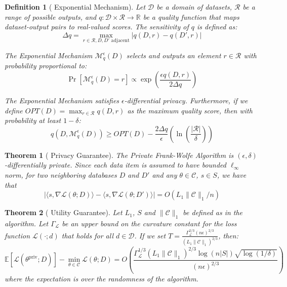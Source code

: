 \documentclass[12pt,letterpaper]{article}
\newtheorem{theorem}{Theorem}[section]
\newtheorem{definition}{Definition}
\begin{document}
\begin{definition}[\cite{ExpMech} Exponential Mechanism]
    \label{def:ExpMech}
    Let $\mathcal{D}$ be a domain of datasets, $\mathcal{R}$ be a range of possible outputs, and $q: \mathcal{D} \times \mathcal{R} \rightarrow \mathbb{R}$ be a quality function that maps dataset-output pairs to real-valued scores. The sensitivity of $q$ is defined as:
    \[
    \Delta q = \max_{r \in \mathcal{R}, D, D' \text{ adjacent}} |q(D,r) - q(D',r)|
    \]
    
    The Exponential Mechanism $\mathcal{M}_q^{\epsilon}(D)$ selects and outputs an element $r \in \mathcal{R}$ with probability proportional to:
    \[
    \Pr[\mathcal{M}_q^{\epsilon}(D) = r] \propto \exp\left(\frac{\epsilon q(D,r)}{2\Delta q}\right)
    \]
    
    The Exponential Mechanism satisfies $\epsilon$-differential privacy. Furthermore, if we define $OPT(D) = \max_{r \in \mathcal{R}} q(D,r)$ as the maximum quality score, then with probability at least $1-\delta$:
    \[
    q(D, \mathcal{M}_q^{\epsilon}(D)) \geq OPT(D) - \frac{2\Delta q}{\epsilon}\left(\ln\left(\frac{|\mathcal{R}|}{\delta}\right)\right)
    \]
\end{definition}


\begin{theorem}[\cite{NIPS2015_52d080a3} Privacy Guarantee]
    \label{thm:dp}
    The Private Frank-Wolfe Algorithm is $(\epsilon, \delta)$-differentially private.
    Since each data item is assumed to have bounded $\ell_{\infty}$ norm, for two neighboring databases $D$ and $D'$ and any $\theta \in \mathcal{C}$, $s \in S$, we have that
    \[
    |\langle s, \nabla \mathcal{L}(\theta; D) \rangle - \langle s, \nabla \mathcal{L}(\theta; D') \rangle| = O(L_1 \|\mathcal{C}\|_1/n)
    \]
\end{theorem}


\begin{theorem}[\cite{NIPS2015_52d080a3} Utility Guarantee]
    \label{thm:util}
    Let $L_1$, $S$ and $\|\mathcal{C}\|_1$ be defined as in the algorithm. Let $\Gamma_{\mathcal{L}}$ be an upper bound on the curvature constant for the loss function $\mathcal{L}(\cdot; d)$ that holds for all $d \in \mathcal{D}$. If we set $T = \frac{\Gamma_{\mathcal{L}}^{2/3}(n\epsilon)^{2/3}}{(L_1\|\mathcal{C}\|_1)^{2/3}}$, then:
    \[
    \mathbb{E}[\mathcal{L}(\theta^{\text{priv}}; D)] - \min_{\theta \in \mathcal{C}}\mathcal{L}(\theta; D) = O\left(\frac{\Gamma_{\mathcal{L}}^{1/3}(L_1\|\mathcal{C}\|_1)^{2/3}\log(n|S|)\sqrt{\log(1/\delta)}}{(n\epsilon)^{2/3}}\right)
    \]
    where the expectation is over the randomness of the algorithm.
\end{theorem}
\end{document}
